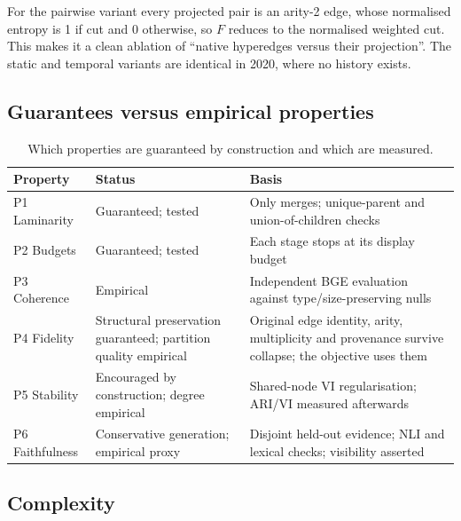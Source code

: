 \documentclass[11pt,a4paper]{article}
\theoremstyle{remark}
\begin{document}
For the pairwise variant every projected pair is an arity-2 edge, whose normalised
entropy is 1 if cut and 0 otherwise, so $F$ reduces to the normalised weighted cut. This
makes it a clean ablation of ``native hyperedges versus their projection''. The static
and temporal variants are identical in 2020, where no history exists.

\subsection{Guarantees versus empirical properties}

\begin{table}[!htbp]
\centering
\caption{Which properties are guaranteed by construction and which are measured.}
\label{tab:properties}
\begin{tabularx}{\linewidth}{lp{3.6cm}X}
\toprule
Property & Status & Basis\\
\midrule
P1 Laminarity & Guaranteed; tested & Only merges; unique-parent and union-of-children checks\\
P2 Budgets & Guaranteed; tested & Each stage stops at its display budget\\
P3 Coherence & Empirical & Independent BGE evaluation against type/size-preserving nulls\\
P4 Fidelity & Structural preservation guaranteed; partition quality empirical & Original edge identity, arity, multiplicity and provenance survive collapse; the objective uses them\\
P5 Stability & Encouraged by construction; degree empirical & Shared-node VI regularisation; ARI/VI measured afterwards\\
P6 Faithfulness & Conservative generation; empirical proxy & Disjoint held-out evidence; NLI and lexical checks; visibility asserted\\
\bottomrule
\end{tabularx}
\end{table}

\subsection{Complexity}
\end{document}
